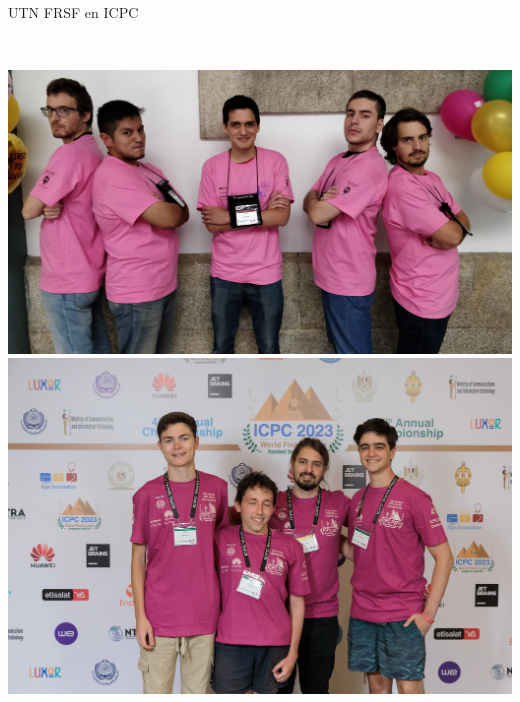\documentclass{beamer}
\begin{document}
\begin{frame}{UTN FRSF en ICPC}
    \begin{columns}[t]
        \\
        \includegraphics[width=1\textwidth]{img/2019_porto.jpg}
        \\
        \includegraphics[width=1\textwidth]{img/2023_egipt.jpg}
    \end{columns}
\end{frame}
\end{document}
